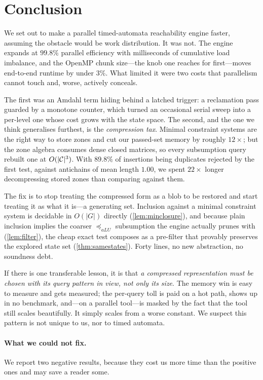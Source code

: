 \section{Conclusion}\label{sec:conclusion}

We set out to make a parallel timed-automata reachability engine faster, assuming
the obstacle would be work distribution.  It was not.  The engine expands at
$99.8\%$ parallel efficiency with milliseconds of cumulative load imbalance, and
the OpenMP chunk size---the knob one reaches for first---moves end-to-end runtime
by under $3\%$.  What limited it were two costs that parallelism cannot touch
and, worse, actively conceals.

The first was an Amdahl term hiding behind a latched trigger: a reclamation pass
guarded by a monotone counter, which turned an occasional serial sweep into a
per-level one whose cost grows with the state space.  The second, and the one we
think generalises furthest, is the \emph{compression tax}.  Minimal constraint
systems are the right way to store zones and cut our passed-set memory by roughly
$12\times$; but the zone algebra consumes dense closed matrices, so every
subsumption query rebuilt one at $O(|\mathcal{C}|^3)$.  With $89.8\%$ of insertions
being duplicates rejected by the first test, against antichains of mean length
$1.00$, we spent $22\times$ longer decompressing stored zones than comparing
against them.

The fix is to stop treating the compressed form as a blob to be restored and
start treating it as what it is---a generating set.  Inclusion against a minimal
constraint system is decidable in $O(|G|)$ directly (\cref{lem:minclosure}), and
because plain inclusion implies the coarser $\preceq_{aLU}$ subsumption the
engine actually prunes with (\cref{lem:filter}), the cheap exact test composes as
a pre-filter that provably preserves the explored state set
(\cref{thm:samestates}).  Forty lines, no new abstraction, no soundness debt.

If there is one transferable lesson, it is that \emph{a compressed representation
must be chosen with its query pattern in view, not only its size}.  The memory
win is easy to measure and gets measured; the per-query toll is paid on a hot
path, shows up in no benchmark, and---on a parallel tool---is masked by the fact
that the tool still scales beautifully.  It simply scales from a worse constant.
We suspect this pattern is not unique to us, nor to timed automata.

\paragraph{What we could not fix.}
We report two negative results, because they cost us more time than the positive
ones and may save a reader some.


